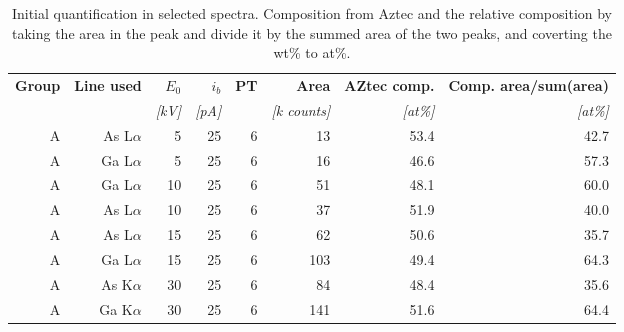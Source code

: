 \begin{table}[phtb]
    \begin{center}
        \caption{
            Initial quantification in selected spectra.
            Composition from Aztec and the relative composition by taking the area in the peak and divide it by the summed area of the two peaks, and coverting the wt\% to at\%.
        }
        \label{tab:results:initial_quantification}
        \begin{tabular}{rrrrrrrr}
            \hline
            \textbf{ Group} & \textbf{Line used} & \textbf{$E_0$} & \textbf{$i_b$} & \textbf{PT} & \textbf{Area}     & \textbf{AZtec comp.} & \textbf{Comp. area/sum(area)} \\
            \emph{}         & \emph{}            & \emph{[kV]}    & \emph{[pA]}    & \emph{}     & \emph{[k counts]} & \emph{[at\%]}        & \emph{[at\%]}                 \\
            \hline
            A               & As L$\alpha$       & 5              & 25             & 6           & 13                & 53.4                 & 42.7                          \\
            A               & Ga L$\alpha$       & 5              & 25             & 6           & 16                & 46.6                 & 57.3                          \\
            A               & Ga L$\alpha$       & 10             & 25             & 6           & 51                & 48.1                 & 60.0                          \\
            A               & As L$\alpha$       & 10             & 25             & 6           & 37                & 51.9                 & 40.0                          \\
            A               & As L$\alpha$       & 15             & 25             & 6           & 62                & 50.6                 & 35.7                          \\
            A               & Ga L$\alpha$       & 15             & 25             & 6           & 103               & 49.4                 & 64.3                          \\
            A               & As K$\alpha$       & 30             & 25             & 6           & 84                & 48.4                 & 35.6                          \\
            A               & Ga K$\alpha$       & 30             & 25             & 6           & 141               & 51.6                 & 64.4                          \\

\end{tabular}
\end{center}
\end{table}
